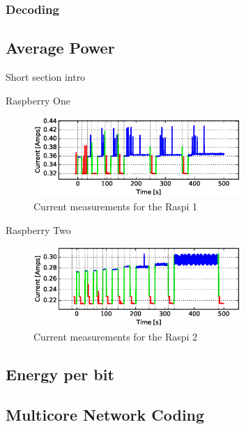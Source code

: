 \subsubsection{Decoding}
%


\subsection{Average Power}
Short section intro

Raspberry One
\begin{figure}[ht!]
\centering
\includegraphics[width=0.7\textwidth]{images/current_vs_sec_raspberry_change_gen_from_-10sec_to_500sec.eps}
\caption{Current measurements for the \ac{Raspi} 1}
\label{current_rasp2}
\end{figure}

Raspberry Two
\begin{figure}[ht!]
\centering
\includegraphics[width=0.7\textwidth]{images/current_vs_sec_raspberry2_change_gen_from_-10sec_to_500sec.eps}
\caption{Current measurements for the \ac{Raspi} 2}
\label{current_rasp2}
\end{figure}

\subsection{Energy per bit}


\subsection{Multicore Network Coding}
\label{subs:multicore-network-coding}

